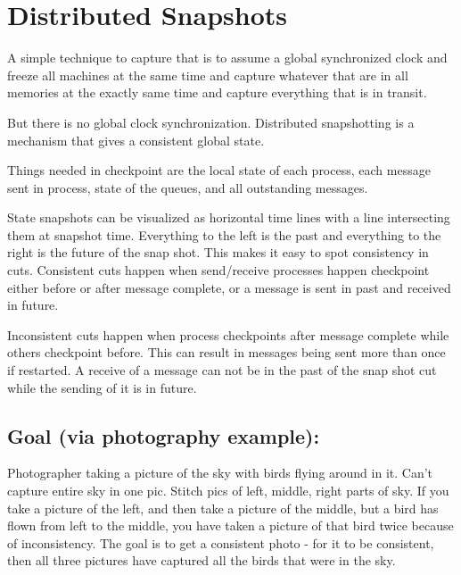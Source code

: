 \documentclass[twoside]{article}
\begin{document}
\section{Distributed Snapshots}
A simple technique to capture that is to assume a global synchronized clock and freeze all machines at the same time and capture whatever that are in all memories at the exactly same time and capture everything that is in transit.

But there is no global clock synchronization. Distributed snapshotting is a mechanism that gives a consistent global state.

Things needed in checkpoint are the local state of each process, each message sent in process, state of the queues, and all outstanding messages.

State snapshots can be visualized as horizontal time lines with a line intersecting them at snapshot time. Everything to the left is the past and everything to the right is the future of the snap shot. This makes it easy to spot consistency in cuts. Consistent cuts happen when send/receive processes happen checkpoint either before or after message complete, or a message is sent in past and received in future.

Inconsistent cuts happen when process checkpoints after message complete while others checkpoint before. This can result in messages being sent more than once if restarted. A receive of a message can not be in the past of the snap shot cut while the sending of it is in future.

\subsection{Goal (via photography example):}
Photographer taking a picture of the sky with birds flying around in it. Can't capture entire sky in one pic. Stitch pics of left, middle, right parts of sky. If you take a picture of the left, and then take a picture of the middle, but a bird has flown from left to the middle, you have taken a picture of that bird twice because of inconsistency. The goal is to get a consistent photo - for it to be consistent, then all three pictures have captured all the birds that were in the sky.
\end{document}
